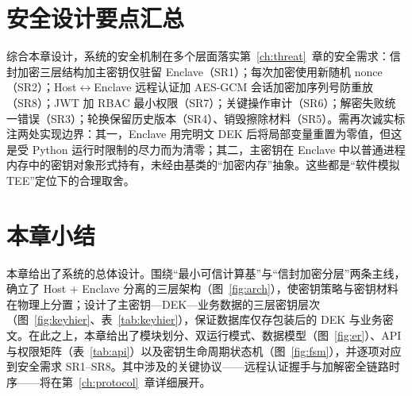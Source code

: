 \section{安全设计要点汇总}

综合本章设计，系统的安全机制在多个层面落实第~\ref{ch:threat}~章的安全需求：信封加密三层结构加主密钥仅驻留 Enclave（SR1）；每次加密使用新随机 nonce（SR2）；Host$\leftrightarrow$Enclave 远程认证加 AES-GCM 会话加密加序列号防重放（SR8）；JWT 加 RBAC 最小权限（SR7）；关键操作审计（SR6）；解密失败统一错误（SR3）；轮换保留历史版本（SR4）、销毁擦除材料（SR5）。需再次诚实标注两处实现边界：其一，Enclave 用完明文 DEK 后将局部变量重置为零值，但这是受 Python 运行时限制的尽力而为清零；其二，主密钥在 Enclave 中以普通进程内存中的密钥对象形式持有，未经由基类的“加密内存”抽象。这些都是“软件模拟 TEE”定位下的合理取舍。

\section{本章小结}

本章给出了系统的总体设计。围绕“最小可信计算基”与“信封加密分层”两条主线，确立了 Host + Enclave 分离的三层架构（图~\ref{fig:arch}），使密钥策略与密钥材料在物理上分置；设计了主密钥—DEK—业务数据的三层密钥层次（图~\ref{fig:keyhier}、表~\ref{tab:keyhier}），保证数据库仅存包装后的 DEK 与业务密文。在此之上，本章给出了模块划分、双运行模式、数据模型（图~\ref{fig:er}）、API 与权限矩阵（表~\ref{tab:api}）以及密钥生命周期状态机（图~\ref{fig:fsm}），并逐项对应到安全需求 SR1--SR8。其中涉及的关键协议——远程认证握手与加解密全链路时序——将在第~\ref{ch:protocol}~章详细展开。
